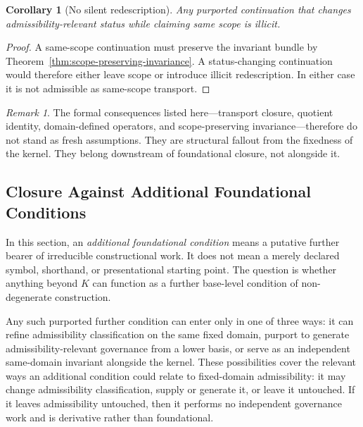 \documentclass[11pt]{article}
\newtheorem{corollary}[theorem]{Corollary}
\theoremstyle{definition}
\theoremstyle{remark}
\newtheorem{remark}[theorem]{Remark}
\begin{document}
\begin{corollary}[No silent redescription]
Any purported continuation that changes admissibility-relevant status while claiming same scope is illicit.
\end{corollary}

\begin{proof}
A same-scope continuation must preserve the invariant bundle by Theorem~\ref{thm:scope-preserving-invariance}. A status-changing continuation would therefore either leave scope or introduce illicit redescription. In either case it is not admissible as same-scope transport.
\end{proof}

\begin{remark}
The formal consequences listed here---transport closure, quotient identity, domain-defined operators, and scope-preserving invariance---therefore do not stand as fresh assumptions. They are structural fallout from the fixedness of the kernel. They belong downstream of foundational closure, not alongside it.
\end{remark}

\subsection{Closure Against Additional Foundational Conditions}

In this section, an \emph{additional foundational condition} means a putative further bearer of irreducible constructional work. It does not mean a merely declared symbol, shorthand, or presentational starting point. The question is whether anything beyond $K$ can function as a further base-level condition of non-degenerate construction.

Any such purported further condition can enter only in one of three ways: it can refine admissibility classification on the same fixed domain, purport to generate admissibility-relevant governance from a lower basis, or serve as an independent same-domain invariant alongside the kernel. These possibilities cover the relevant ways an additional condition could relate to fixed-domain admissibility: it may change admissibility classification, supply or generate it, or leave it untouched. If it leaves admissibility untouched, then it performs no independent governance work and is derivative rather than foundational.
\end{document}
